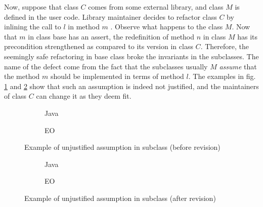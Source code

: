Now, suppose that class $C$ comes from some external library, and class $M$ is defined in the user code. Library maintainer decides to refactor class $C$ by inlining the call to $l$ in method $m$ . Observe what happens to the class $M$. Now that $m$ in class base has an assert, the redefinition of method $n$ in class $M$ has its precondition strengthened as compared to its version in class $C$. Therefore, the seemingly safe refactoring in base class broke the invariants in the subclasses. The name of the defect come from the fact that the subclasses usually $M$ \textit{assume} that the method $m$ should be implemented in terms of method $l$. The examples in fig. \ref{fig:unjustified_before} and \ref{fig:unjustified_after} show that such an assumption is indeed not justified, and the maintainers of class $C$ can change it as they deem fit.

\begin{figure}
    \centering
    \begin{subfigure}{0.4\textwidth}
        
        \caption{Java}
    \end{subfigure}
    \hfill
    \begin{subfigure}{0.4\textwidth}
        
        \caption{EO}
    \end{subfigure}
    \caption{Example of unjustified assumption in subclass (before revision)}
    \label{fig:unjustified_before}
\end{figure}

\begin{figure}
    \centering
    \begin{subfigure}{0.4\textwidth}
        
        \caption{Java}
    \end{subfigure}
    \hfill
    \begin{subfigure}{0.4\textwidth}
        
        \caption{EO}
    \end{subfigure}
    \caption{Example of unjustified assumption in subclass (after revision)}
    \label{fig:unjustified_after}
\end{figure}



\newpage
